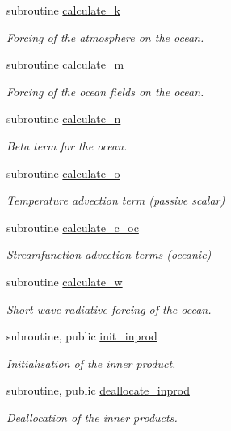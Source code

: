 \begin{DoxyCompactItemize}
subroutine \hyperlink{namespaceinprod__analytic_acb883b9fbefbca46b83b384ee74ed703}{calculate\+\_\+k}
\begin{DoxyCompactList}\small\item\em Forcing of the atmosphere on the ocean. \end{DoxyCompactList}\item 
subroutine \hyperlink{namespaceinprod__analytic_ad89fa4b40a4f55e72942f09427d2bafd}{calculate\+\_\+m}
\begin{DoxyCompactList}\small\item\em Forcing of the ocean fields on the ocean. \end{DoxyCompactList}\item 
subroutine \hyperlink{namespaceinprod__analytic_a76eeb8a6a44af38e397edd7e0617afca}{calculate\+\_\+n}
\begin{DoxyCompactList}\small\item\em Beta term for the ocean. \end{DoxyCompactList}\item 
subroutine \hyperlink{namespaceinprod__analytic_a8b820fd46bfdc62c6ae712d4cbfd072f}{calculate\+\_\+o}
\begin{DoxyCompactList}\small\item\em Temperature advection term (passive scalar) \end{DoxyCompactList}\item 
subroutine \hyperlink{namespaceinprod__analytic_aa45dedb07b415eb4cbdb908268c00aa9}{calculate\+\_\+c\+\_\+oc}
\begin{DoxyCompactList}\small\item\em Streamfunction advection terms (oceanic) \end{DoxyCompactList}\item 
subroutine \hyperlink{namespaceinprod__analytic_ad275ee27fa04491805aa7a648183a754}{calculate\+\_\+w}
\begin{DoxyCompactList}\small\item\em Short-\/wave radiative forcing of the ocean. \end{DoxyCompactList}\item 
subroutine, public \hyperlink{namespaceinprod__analytic_a7491dd2b8ba26eb10d160eb0bf072e56}{init\+\_\+inprod}
\begin{DoxyCompactList}\small\item\em Initialisation of the inner product. \end{DoxyCompactList}\item 
subroutine, public \hyperlink{namespaceinprod__analytic_a77718deee55b484b0946e6c8faf72cd6}{deallocate\+\_\+inprod}
\begin{DoxyCompactList}\small\item\em Deallocation of the inner products. \end{DoxyCompactList}\end{DoxyCompactItemize}
